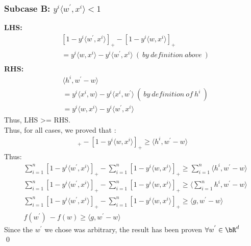 \documentclass[a4paper,11pt]{article}
\begin{document}
\begin{mlsolution}
\subsubsection*{Subcase B: $y^{i}\langle w^{'},x^i \rangle < 1$}

\textbf{LHS:} 
\begin{align}
    &[1-y^{i}\langle w^{'},x^i \rangle ]_{+} - [1-y^{i}\langle w,x^i \rangle ]_{+} \\
    &= y^{i}\langle w,x^i \rangle - y^{i}\langle w^{'},x^i \rangle \ ( \ by \ definition \ above \ ) \\
\end{align}
\textbf{RHS:}
\begin{align}
     &\langle h^i, w^{'} - w \rangle\\
    &= y^{i}\langle x^i,w \rangle - y^{i}\langle x^i,w^{'} \rangle  \ ( \ by \ definition \ of \ h^i \ )\\
    &= y^{i}\langle w,x^i \rangle - y^{i}\langle w^{'},x^i \rangle
\end{align}
Thus, LHS \textgreater =  RHS.\\
Thus, for all cases, we proved that :
\begin{align}
    [1-y^{i}\langle w^{'},x^i \rangle ]_{+} - [1-y^{i}\langle w,x^i \rangle ]_{+} \geq \langle h^i, w^{'} - w \rangle
\end{align}
Thus: \\
\begin{align}
    &\sum_{i=1}^{n}[1-y^{i}\langle w^{'},x^i \rangle ]_{+} - \sum_{i=1}^{n}[1-y^{i}\langle w,x^i \rangle ]_{+} \geq \sum_{i=1}^{n}\langle h^i, w^{'} - w \rangle \\
    &\sum_{i=1}^{n}[1-y^{i}\langle w^{'},x^i \rangle ]_{+} - \sum_{i=1}^{n}[1-y^{i}\langle w,x^i \rangle ]_{+} \geq \langle \sum_{i=1}^{n}h^i, w^{'} - w \rangle \\
    &\sum_{i=1}^{n}[1-y^{i}\langle w^{'},x^i \rangle ]_{+} - \sum_{i=1}^{n}[1-y^{i}\langle w,x^i \rangle ]_{+} \geq \langle g, w^{'} - w \rangle \\
    &f(w^{'}) \ - f(w) \geq \langle g, w^{'} - w \rangle
\end{align}
Since the $w^{'}$ we chose was arbitrary, the result has been proven $\forall w^{'} \in \bR^d$\\
\qed
\end{mlsolution}
			
\end{document}
